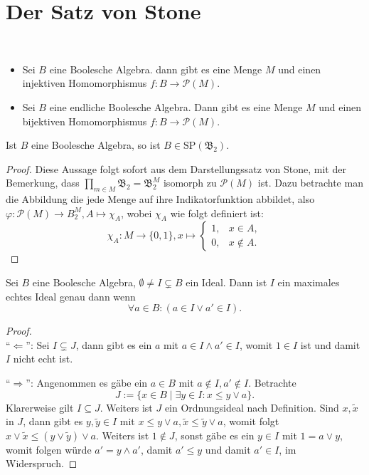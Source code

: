 \section{Der Satz von Stone}

\begin{theorem}{\ }
    \begin{itemize}
        \item Sei $B$ eine Boolesche Algebra. dann gibt es eine Menge $M$ und einen injektiven Homomorphismus $f : B \to \mathcal{P}(M)$.
        \item Sei $B$ eine endliche Boolesche Algebra. Dann gibt es eine Menge $M$ und einen bijektiven Homomorphismus $f : B \to \mathcal{P}(M)$.
    \end{itemize}
\end{theorem}

\begin{corollary}
    Ist $B$ eine Boolesche Algebra, so ist $B \in \mathrm{SP}(\mathfrak{B}_2)$.
\end{corollary}

\begin{proof}
    Diese Aussage folgt sofort aus dem Darstellungssatz von Stone, mit der Bemerkung, dass $\prod_{m\in M}\mathfrak{B}_2=\mathfrak{B}_2^M$ isomorph zu $\mathcal{P}(M)$ ist. Dazu betrachte man die Abbildung die jede Menge auf ihre Indikatorfunktion abbildet, also $\varphi:\mathcal{P}(M)\to B_2^M, A\mapsto \chi_A$, wobei $\chi_A$ wie folgt definiert ist:$$\chi_A:M\to\{0,1\}, x\mapsto\begin{cases}
        1, & x\in A,\\ 0,& x \not\in A.
    \end{cases}$$
\end{proof}

\begin{lemma}
    Sei $B$ eine Boolesche Algebra, $\emptyset \neq I \subsetneq B$ ein Ideal. Dann ist $I$ ein maximales echtes Ideal genau dann wenn
    $$ \forall a \in B : (a \in I \lor a' \in I). $$
\end{lemma}

\begin{proof}{\ } \\
    ``$\Leftarrow$'': Sei $I \subsetneq J$, dann gibt es ein $a$ mit $a \in I \land a' \in I$, womit $1 \in I$ ist und damit $I$ nicht echt ist.

    ``$\Rightarrow$'': Angenommen es gäbe ein $a \in B$ mit $a \notin I, a' \notin I$. Betrachte
    $$ J := \{ x \in B \mid \exists y \in I: x \leq y \lor a \}. $$
    Klarerweise gilt $I \subseteq J$. Weiters ist $J$ ein Ordnungsideal nach Definition. Sind $x, \widetilde{x}$ in $J$, dann gibt es $y, \widetilde{y} \in I$ mit $x \leq y \lor a, \widetilde{x} \leq \widetilde{y} \lor a$, womit folgt $x \lor \widetilde{x} \leq (y \lor \widetilde{y}) \lor a$. Weiters ist $1 \notin J$, sonst gäbe es ein $y \in I$ mit $1 = a \lor y$, womit folgen würde $a' = y \land a'$, damit $a' \leq y$ und damit $a' \in I$, im Widerspruch.
\end{proof}

